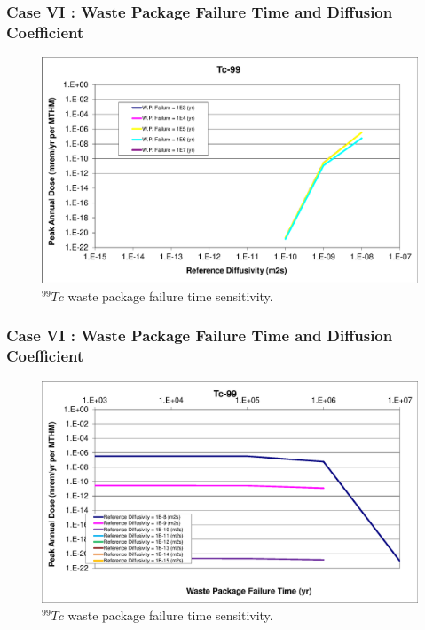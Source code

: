 \begin{frame}[c]
  \frametitle{Case VI : Waste Package Failure Time and Diffusion Coefficient}
\begin{figure}[ht!]
\centering
\includegraphics[width=\linewidth]{WPFailExtended/Tc-99.eps}
\caption{$^{99}Tc$ waste package failure time sensitivity. }
\label{fig:WPFailTc99}
\end{figure}
\end{frame}

\begin{frame}[c]
  \frametitle{Case VI : Waste Package Failure Time and Diffusion Coefficient}

\begin{figure}[ht!]
\centering
\includegraphics[width=\linewidth]{WPFailExtended/Tc-99-WPFail.eps}
\caption{$^{99}Tc$ waste package failure time sensitivity. }
\label{fig:WPFailTc99}
\end{figure}
\end{frame}

